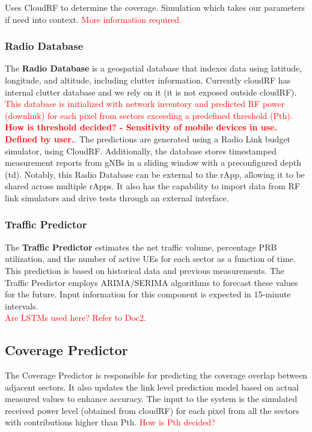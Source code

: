\documentclass[conference]{IEEEtran}
\begin{document}
Uses CloudRF to determine the coverage. Simulation which takes our parameters if need into context. \textcolor{red}{More information required.} \\

\subsubsection{Radio Database}

The \textbf{Radio Database} is a geospatial database that indexes data using latitude, longitude, and altitude, including clutter information. Currently cloudRF has internal clutter database and we rely on it (it is not exposed outside cloudRF). \textcolor{red}{This database is initialized with network inventory and predicted RF power (downlink) for each pixel from sectors exceeding a predefined threshold (Pth). \textbf{How is threshold decided? - Sensitivity of mobile devices in use. Defined by user.}}. The predictions are generated using a Radio Link budget simulator, using CloudRF. Additionally, the database stores timestamped measurement reports from gNBs in a sliding window with a preconfigured depth (td). Notably, this Radio Database can be external to the rApp, allowing it to be shared across multiple rApps. It also has the capability to import data from RF link simulators and drive tests through an external interface. \\

\subsubsection{Traffic Predictor}

The \textbf{Traffic Predictor} estimates the net traffic volume, percentage PRB utilization, and the number of active UEs for each sector as a function of time. This prediction is based on historical data and previous measurements. The Traffic Predictor employs ARIMA/SERIMA algorithms to forecast these values for the future. Input information for this component is expected in 15-minute intervals. \\

\textcolor{red}{Are LSTMs used here? Refer to Doc2.}

\subsection{Coverage Predictor}

The Coverage Predictor is responsible for predicting the coverage overlap between adjacent sectors. It also updates the link level prediction model based on actual measured values to enhance accuracy. The input to the system is the simulated received power level (obtained from cloudRF) for each pixel from all the sectors with contributions higher than Pth. \textcolor{red}{How is Pth decided?} \\
\end{document}

